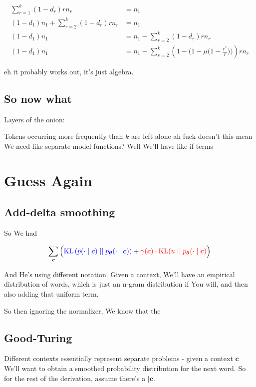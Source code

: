 \documentclass{article}
\newcommand{\KL}{\mathrm{KL}}
\newcommand{\uniform}{u}
\newcommand{\vtheta}{\boldsymbol{\theta}}
\newcommand{\model}{p_{\vtheta}}
\newcommand{\context}{\boldsymbol{c}}
\begin{document}
		\begin{align}
			\sum^k_{r=1} (1-d_r) r n_r &= n_1\\
			(1-d_1)  n_1 + \sum^k_{r=2} (1-d_r) r n_r &= n_1\\
			(1-d_1)  n_1  &= n_1 - \sum^k_{r=2} (1-d_r) r n_r\\
			(1-d_1)  n_1  &= n_1 - \sum^k_{r=2} (1-\bigg( 1-\mu\bigg(1-\frac{r^*}{r} \bigg)\bigg)) r n_r
		\end{align}
		
		eh it probably works out, it's just algebra. 
		
	\subsection{So now what}
	
		Layers of the onion:
		
		Tokens occurring more frequently than $k$ are left alone ah fuck doesn't this mean We need like separate model functions? Well We'll have like if terms
		

\newpage		
\section{Guess Again}

	\subsection{Add-delta smoothing}
		
		So We had
		
		\begin{align}
	  		\sum_{\context} \Big( {\color{blue} \KL\left(\tilde{p}(\cdot 			\mid \context) \mid\mid \model(\cdot \mid \context)					\right)} + {\color{red}\gamma(\context) \cdot 						\KL(\uniform \mid\mid \model(\cdot \mid \context)}\Big)
		\end{align}
		
		And He's using different notation. Given a context, We'll have an empirical distribution of words, which is just an n-gram distribution if You will, and then also adding that uniform term.
		
		So then ignoring the normalizer, We know that the 
		
	\subsection{Good-Turing}
		Different contexts essentially represent separate problems - given a context $\context$ We'll want to obtain a smoothed probability distribution for the next word. So for the rest of the derivation, assume there's a $|\context$. 
		
\end{document}
